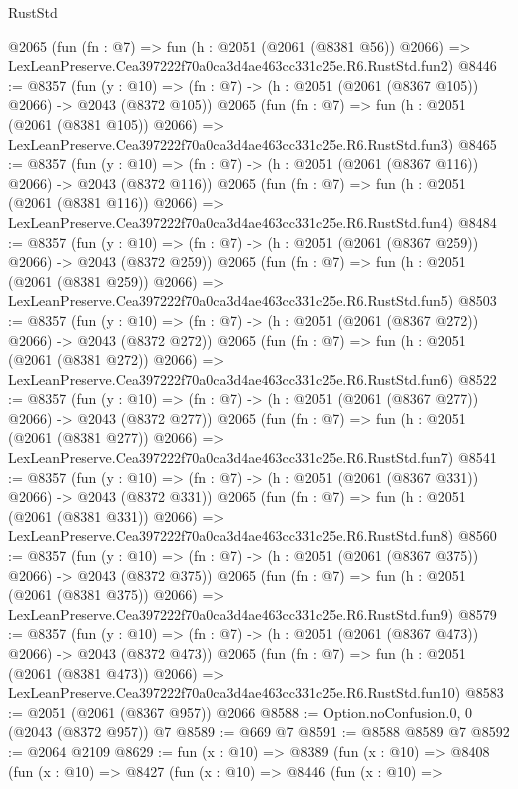 \begin{lexlean}{RustStd}
\begin{coremodule}
    @2065
    (fun (fn : @7) =>
    fun (h : @2051 (@2061 (@8381 @56)) @2066) =>
    LexLeanPreserve.Cea397222f70a0ca3d4ae463cc331c25e.R6.RustStd.fun2)
@8446 := @8357
    (fun (y : @10) => (fn : @7) -> (h : @2051 (@2061 (@8367 @105)) @2066) -> @2043 (@8372 @105))
    @2065
    (fun (fn : @7) =>
    fun (h : @2051 (@2061 (@8381 @105)) @2066) =>
    LexLeanPreserve.Cea397222f70a0ca3d4ae463cc331c25e.R6.RustStd.fun3)
@8465 := @8357
    (fun (y : @10) => (fn : @7) -> (h : @2051 (@2061 (@8367 @116)) @2066) -> @2043 (@8372 @116))
    @2065
    (fun (fn : @7) =>
    fun (h : @2051 (@2061 (@8381 @116)) @2066) =>
    LexLeanPreserve.Cea397222f70a0ca3d4ae463cc331c25e.R6.RustStd.fun4)
@8484 := @8357
    (fun (y : @10) => (fn : @7) -> (h : @2051 (@2061 (@8367 @259)) @2066) -> @2043 (@8372 @259))
    @2065
    (fun (fn : @7) =>
    fun (h : @2051 (@2061 (@8381 @259)) @2066) =>
    LexLeanPreserve.Cea397222f70a0ca3d4ae463cc331c25e.R6.RustStd.fun5)
@8503 := @8357
    (fun (y : @10) => (fn : @7) -> (h : @2051 (@2061 (@8367 @272)) @2066) -> @2043 (@8372 @272))
    @2065
    (fun (fn : @7) =>
    fun (h : @2051 (@2061 (@8381 @272)) @2066) =>
    LexLeanPreserve.Cea397222f70a0ca3d4ae463cc331c25e.R6.RustStd.fun6)
@8522 := @8357
    (fun (y : @10) => (fn : @7) -> (h : @2051 (@2061 (@8367 @277)) @2066) -> @2043 (@8372 @277))
    @2065
    (fun (fn : @7) =>
    fun (h : @2051 (@2061 (@8381 @277)) @2066) =>
    LexLeanPreserve.Cea397222f70a0ca3d4ae463cc331c25e.R6.RustStd.fun7)
@8541 := @8357
    (fun (y : @10) => (fn : @7) -> (h : @2051 (@2061 (@8367 @331)) @2066) -> @2043 (@8372 @331))
    @2065
    (fun (fn : @7) =>
    fun (h : @2051 (@2061 (@8381 @331)) @2066) =>
    LexLeanPreserve.Cea397222f70a0ca3d4ae463cc331c25e.R6.RustStd.fun8)
@8560 := @8357
    (fun (y : @10) => (fn : @7) -> (h : @2051 (@2061 (@8367 @375)) @2066) -> @2043 (@8372 @375))
    @2065
    (fun (fn : @7) =>
    fun (h : @2051 (@2061 (@8381 @375)) @2066) =>
    LexLeanPreserve.Cea397222f70a0ca3d4ae463cc331c25e.R6.RustStd.fun9)
@8579 := @8357
    (fun (y : @10) => (fn : @7) -> (h : @2051 (@2061 (@8367 @473)) @2066) -> @2043 (@8372 @473))
    @2065
    (fun (fn : @7) =>
    fun (h : @2051 (@2061 (@8381 @473)) @2066) =>
    LexLeanPreserve.Cea397222f70a0ca3d4ae463cc331c25e.R6.RustStd.fun10)
@8583 := @2051 (@2061 (@8367 @957)) @2066
@8588 := Option.noConfusion.{0, 0} (@2043 (@8372 @957)) @7
@8589 := @669 @7
@8591 := @8588 @8589 @7
@8592 := @2064 @2109
@8629 := fun (x : @10) =>
  @8389
    (fun (x : @10) =>
    @8408
      (fun (x : @10) =>
      @8427
        (fun (x : @10) =>
        @8446
          (fun (x : @10) =>

\end{coremodule}
\end{lexlean}
